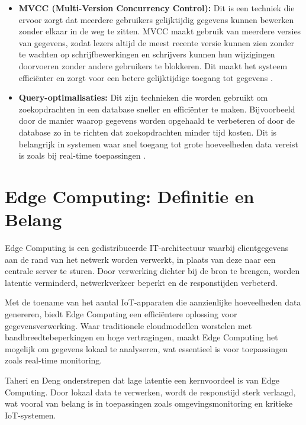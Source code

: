 \begin{itemize}
    \item \textbf{MVCC (Multi-Version Concurrency Control):} Dit is een techniek die ervoor zorgt dat meerdere gebruikers gelijktijdig gegevens kunnen bewerken zonder elkaar in de weg te zitten. MVCC maakt gebruik van meerdere versies van gegevens, zodat lezers altijd de meest recente versie kunnen zien zonder te wachten op schrijfbewerkingen en schrijvers kunnen hun wijzigingen doorvoeren zonder andere gebruikers te blokkeren. Dit maakt het systeem efficiënter en zorgt voor een betere gelijktijdige toegang tot gegevens \autocite{Wiseso2020PerformanceAnalysis}.

    \item \textbf{Query-optimalisaties:} Dit zijn technieken die worden gebruikt om zoekopdrachten in een database sneller en efficiënter te maken. Bijvoorbeeld door de manier waarop gegevens worden opgehaald te verbeteren of door de database zo in te richten dat zoekopdrachten minder tijd kosten. Dit is belangrijk in systemen waar snel toegang tot grote hoeveelheden data vereist is zoals bij real-time toepassingen \autocite{Gyorodi2015comparative}.
\end{itemize}

\section{Edge Computing: Definitie en Belang}
\label{sec:edge-computing}

Edge Computing is een gedistribueerde IT-architectuur waarbij clientgegevens aan de rand van het netwerk worden verwerkt, in plaats van deze naar een centrale server te sturen\autocite{Shi2016}. Door verwerking dichter bij de bron te brengen, worden latentie verminderd, netwerkverkeer beperkt en de responstijden verbeterd.

Met de toename van het aantal IoT-apparaten die aanzienlijke hoeveelheden data genereren, biedt Edge Computing een efficiëntere oplossing voor gegevensverwerking\autocite{Shi2016}. Waar traditionele cloudmodellen worstelen met bandbreedtebeperkingen en hoge vertragingen, maakt Edge Computing het mogelijk om gegevens lokaal te analyseren, wat essentieel is voor toepassingen zoals real-time monitoring.

Taheri en Deng onderstrepen dat lage latentie een kernvoordeel is van Edge Computing\autocite{Taheri2020}. Door lokaal data te verwerken, wordt de responstijd sterk verlaagd, wat vooral van belang is in toepassingen zoals omgevingsmonitoring en kritieke IoT-systemen.

